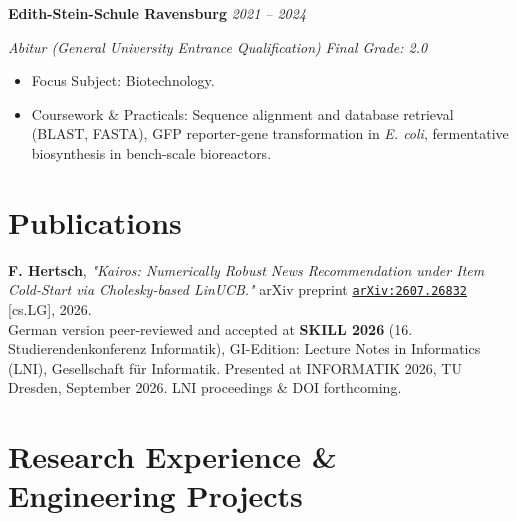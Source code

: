 \documentclass[10pt, a4paper]{article}
\newcommand{\cvitem}[2]{
  \vspace{1.5pt}
  \noindent\textbf{#1} \hfill \textit{#2} \par
  \vspace{-1pt}
}
\begin{document}
\vspace{2pt}
\cvitem{Edith-Stein-Schule Ravensburg}{2021 -- 2024}
\textit{Abitur (General University Entrance Qualification)} \hfill \textit{Final Grade: 2.0}\\
\vspace{-4pt}
\begin{itemize}[leftmargin=0.15in, label=\textbullet, itemsep=1pt, topsep=1.5pt]
  \item Focus Subject: Biotechnology.
  \item Coursework \& Practicals: Sequence alignment and database retrieval (BLAST, FASTA), GFP reporter-gene transformation in \textit{E. coli}, fermentative biosynthesis in bench-scale bioreactors.
\end{itemize}

\section*{Publications}

\begin{enumerate}[leftmargin=0.25in, label={[\arabic*]}, itemsep=2pt, topsep=2pt]
  \item \textbf{F. Hertsch}, \textit{"Kairos: Numerically Robust News Recommendation under Item Cold-Start via Cholesky-based LinUCB."} arXiv preprint \href{https://arxiv.org/abs/2607.26832}{\texttt{arXiv:2607.26832}} [cs.LG], 2026. \\
  German version peer-reviewed and accepted at \textbf{SKILL 2026} (16. Studierendenkonferenz Informatik), GI-Edition: Lecture Notes in Informatics (LNI), Gesellschaft f{\"u}r Informatik. Presented at INFORMATIK 2026, TU Dresden, September 2026. LNI proceedings \& DOI forthcoming.
\end{enumerate}

\section*{Research Experience \& Engineering Projects}
\end{document}
